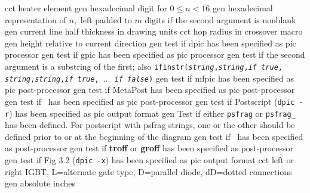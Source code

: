   {cct}
  {heater element}
  {gen}
  {hexadecimal digit for $0 \leq n < 16$}
  {gen}
  {hexadecimal representation of $n,$ left padded to $m$ digits if the second
   argument is nonblank}
  {gen}
  {current line half thickness in drawing units}
  {cct}
  {hop radius in crossover macro}
  {gen}
  {height relative to current direction}
  {gen}
  {test if dpic has been specified as pic processor}
  {gen}
  {test if gpic has been specified as pic processor}
  {gen}
  {test if the second argument is a substring of the first; also
  {\tt ifinstr({\sl string},{\sl string},{\sl if true},{\sl
  string},{\sl string},{\sl if true}, $\ldots$ {\sl if false})}
    }
  {gen}
  {test if mfpic has been specified as pic post-processor}
  {gen}
  {test if MetaPost has been specified as pic post-processor}
  {gen}
  {test if \TPGF~has been specified as pic post-processor}
  {gen}
  {test if Postscript ({\tt dpic -r}) has been specified as pic output format}
  {gen}
  {Test if either {\tt psfrag} or {\tt psfrag\_} has been defined. For
   postscript with psfrag strings, one or the other should be defined
   prior to or at the beginning of the diagram}
  {gen}
  {test if \PSTricks~has been specified as post-processor}
  {gen}
  {test if {\bf troff} or {\bf groff} has been specified as post-processor}
  {gen}
  {test if Fig 3.2 ({\tt dpic -x}) has been specified as pic output format}
  {cct}
  {left or right IGBT, L=alternate gate type, D=parallel diode,
   dD=dotted connections }
  {gen}
  {absolute inches}
